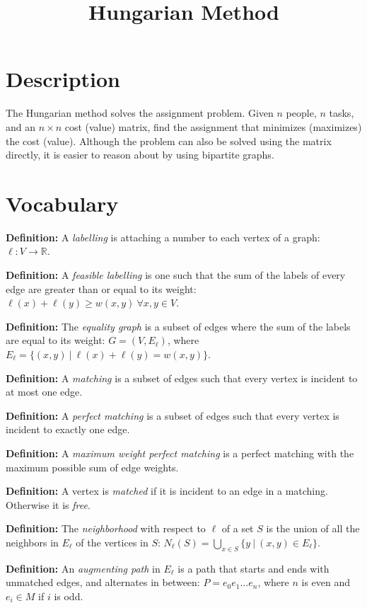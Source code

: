 \documentclass[12pt]{article}
\newcommand{\defn}{\noindent \textbf{Definition: }}
\begin{document}
\title{Hungarian Method}
\author{}
\maketitle


\section*{Description}
The Hungarian method solves the assignment problem. Given $n$ people, $n$ tasks, and an $n \times n$ cost (value) matrix, find the assignment that minimizes (maximizes) the cost (value). Although the problem can also be solved using the matrix directly, it is easier to reason about by using bipartite graphs.

\section*{Vocabulary}

\defn A \emph{labelling} is attaching a number to each vertex of a graph: $\ell: V \rightarrow \mathbb{R}$.

\defn A \emph{feasible labelling} is one such that the sum of the labels of every edge are greater than or equal to its weight: $\ell(x) + \ell(y) \geq w(x,y) \ \forall x,y \in V$.

\defn The \emph{equality graph} is a subset of edges where the sum of the labels are equal to its weight: $G = (V, E_\ell)$, where $E_\ell = \{ (x,y) \ | \ \ell(x) + \ell(y) = w(x,y) \}$.

\defn A \emph{matching} is a subset of edges such that every vertex is incident to at most one edge.

\defn A \emph{perfect matching} is a subset of edges such that every vertex is incident to exactly one edge.

\defn A \emph{maximum weight perfect matching} is a perfect matching with the maximum possible sum of edge weights.

\defn A vertex is \emph{matched} if it is incident to an edge in a matching. Otherwise it is \emph{free}.

\defn The \emph{neighborhood} with respect to $\ell$ of a set $S$ is the union of all the neighbors in $E_\ell$ of the vertices in $S$: $N_\ell(S) = \bigcup_{x \in S}\{ y \ | \ (x,y) \in E_\ell \}$.

\defn An \emph{augmenting path} in $E_\ell$ is a path that starts and ends with unmatched edges, and alternates in between: $P = e_0 e_1\ldots e_n$, where $n$ is even and $e_i \in M$ if $i$ is odd.
\end{document}
